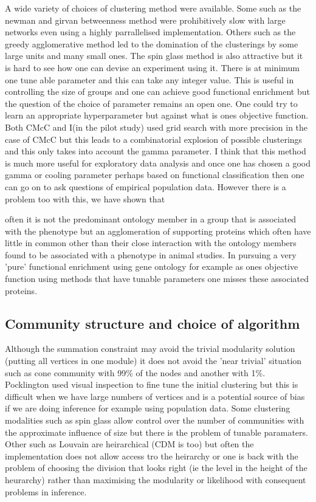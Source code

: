 A wide variety of choices of clustering method were available. Some such as the newman and girvan betweenness method were prohibitively slow with large networks even using a highly parrallelised implementation. Others such as the greedy agglomerative method led to the domination of the clusterings by some large units and many small ones. The spin glass method is also attractive but it is hard to see how one can devise an experiment using it. There is at minimum one tune able parameter and this can take any integer value. This is useful in controlling the size of groups and one can achieve good functional enrichment but the question of the choice of parameter remains an open one. One could try to learn an appropriate hyperparameter but against what is ones objective function. Both CMcC and I(in the pilot study) used grid search with more precision in the case of CMcC but this leads to a combinatorial explosion of possible clusterings and this only takes into account the gamma parameter. I think that this method is much more useful for exploratory data analysis and once one has chosen a good gamma or cooling parameter perhaps based on functional classification then one can go on to ask questions of empirical population data. However there is a problem too with this, we have shown that


 often it is not the predominant ontology member in a group that is associated with the phenotype but an agglomeration of supporting proteins which often have little in common other than their close interaction with the ontology members found to be associated with a phenotype in animal studies. In pursuing a very 'pure' functional enrichment using gene ontology for example as ones objective function using methods that have tunable parameters one misses these associated proteins. 

\subsection{Community structure and choice of algorithm}

Although the summation constraint  may avoid the trivial modularity solution (putting all vertices in one module) it does not avoid the 'near trivial' situation such as cone community with 99\% of the nodes and another with 1\%. Pocklington used visual inspection to fine tune the initial clustering but this is difficult when we have large numbers of vertices and is a potential source of bias if we are doing inference for example using population data. Some clustering modalities such as spin glass allow control over the number of communities with the approximate influence of size but there is the problem of tunable paramaters. Other such as Louvain are heirarchical (CDM is too) but often the implementation does not allow access tro the heirarchy or one is back with the problem of choosing the division that looks right (ie the level in the height of the heurarchy) rather than maximising the modularity or likelihood with consequent problems in inference. 

